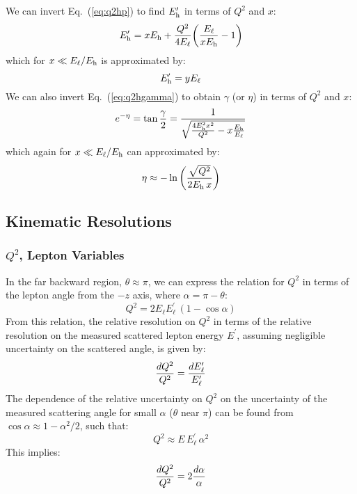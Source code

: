 \documentclass[12pt]{article}
\begin{document}
We can invert Eq.~(\ref{eq:q2hp}) to find $E^\prime_{\rm h}$ in terms of $Q^2$ and $x$:
%
\begin{equation}
E^\prime_{\rm h}  = xE_{\rm h} + {Q^2 \over 4 E_\ell}\bigg({E_\ell \over x E_{\rm h}} - 1 \bigg)
\label{eq:hp}
\end{equation}
%
which for $x \ll E_\ell/E_{\rm h}$ is approximated by:
%
\begin{equation}
E^\prime_{\rm h}  = yE_\ell 
\end{equation}
%
We can also invert Eq.~(\ref{eq:q2hgamma}) to obtain $\gamma$ (or $\eta$) in terms of $Q^2$ and $x$:
%
\begin{equation}
e^{-\eta} = \tan {\gamma \over 2}   = { 1 \over \sqrt{{4E_{\rm h}^2 x^2 \over Q^2} - x {E_{\rm h} \over E_\ell} }  }  
\label{eq:gamma}
\end{equation}
%
which again for $x \ll E_\ell/E_{\rm h}$ can approximated by:
%
\begin{equation}
\eta \approx -\ln \bigg( {\sqrt{Q^2} \over 2 E_{\rm h}\, x } \bigg)
\end{equation}
%

\subsection{Kinematic Resolutions}

\subsubsection{$Q^2$, Lepton Variables}

In the far backward region, $\theta \approx \pi$, we can express the relation for $Q^2$ in terms of the lepton angle from the $-z$ axis, where $\alpha = \pi - \theta$:
%
\begin{equation}
Q^2 = 2 E_\ell E^\prime_\ell\, (1- \cos \alpha)
\label{eq:Q2alpha}
\end{equation}
%
From this relation, the relative resolution on $Q^2$ in terms of the relative resolution on the measured scattered lepton energy $E^\prime$, assuming negligible uncertainty on the scattered angle, is given by:
%
\begin{equation}
  {dQ^2 \over Q^2} = {dE^\prime_{\ell} \over E^\prime_{\ell}}
\label{eq:dQ2Elep}
\end{equation}
%
The dependence of the relative uncertainty on $Q^2$ on the uncertainty of the measured scattering angle for small $\alpha$ ($\theta$ near $\pi$) can be found from $\cos\alpha \approx 1-\alpha^2/2$, such that:
%
\begin{equation}
Q^2 \approx E\,E^\prime_{\ell}\, \alpha^2
\end{equation}
This implies:
%
\begin{equation}
  {dQ^2 \over Q^2} = 2{d\alpha \over \alpha}
\label{eq:dQ2alpha}
\end{equation}
%
\end{document}
